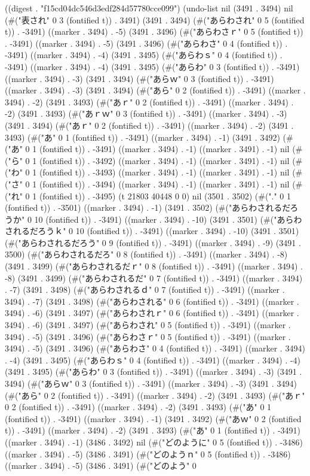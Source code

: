 
((digest . "f15cd04dc546d3edf284d57780cce099") (undo-list nil (3491 . 3494) nil (#("表され" 0 3 (fontified t)) . 3491) (3491 . 3494) (#("あらわされ" 0 5 (fontified t)) . -3491) ((marker . 3494) . -5) (3491 . 3496) (#("あらわさｒ" 0 5 (fontified t)) . -3491) ((marker . 3494) . -5) (3491 . 3496) (#("あらわさ" 0 4 (fontified t)) . -3491) ((marker . 3494) . -4) (3491 . 3495) (#("あらわｓ" 0 4 (fontified t)) . -3491) ((marker . 3494) . -4) (3491 . 3495) (#("あらわ" 0 3 (fontified t)) . -3491) ((marker . 3494) . -3) (3491 . 3494) (#("あらｗ" 0 3 (fontified t)) . -3491) ((marker . 3494) . -3) (3491 . 3494) (#("あら" 0 2 (fontified t)) . -3491) ((marker . 3494) . -2) (3491 . 3493) (#("あｒ" 0 2 (fontified t)) . -3491) ((marker . 3494) . -2) (3491 . 3493) (#("あｒｗ" 0 3 (fontified t)) . -3491) ((marker . 3494) . -3) (3491 . 3494) (#("あｒ" 0 2 (fontified t)) . -3491) ((marker . 3494) . -2) (3491 . 3493) (#("あ" 0 1 (fontified t)) . -3491) ((marker . 3494) . -1) (3491 . 3492) (#("あ" 0 1 (fontified t)) . -3491) ((marker . 3494) . -1) ((marker . 3491) . -1) nil (#("ら" 0 1 (fontified t)) . -3492) ((marker . 3494) . -1) ((marker . 3491) . -1) nil (#("わ" 0 1 (fontified t)) . -3493) ((marker . 3494) . -1) ((marker . 3491) . -1) nil (#("さ" 0 1 (fontified t)) . -3494) ((marker . 3494) . -1) ((marker . 3491) . -1) nil (#("れ" 0 1 (fontified t)) . -3495) (t 21803 40448 0 0) nil (3501 . 3502) (#("." 0 1 (fontified t)) . -3501) ((marker . 3494) . -1) (3491 . 3502) (#("あらわされるだろうか" 0 10 (fontified t)) . -3491) ((marker . 3494) . -10) (3491 . 3501) (#("あらわされるだろうｋ" 0 10 (fontified t)) . -3491) ((marker . 3494) . -10) (3491 . 3501) (#("あらわされるだろう" 0 9 (fontified t)) . -3491) ((marker . 3494) . -9) (3491 . 3500) (#("あらわされるだろ" 0 8 (fontified t)) . -3491) ((marker . 3494) . -8) (3491 . 3499) (#("あらわされるだｒ" 0 8 (fontified t)) . -3491) ((marker . 3494) . -8) (3491 . 3499) (#("あらわされるだ" 0 7 (fontified t)) . -3491) ((marker . 3494) . -7) (3491 . 3498) (#("あらわされるｄ" 0 7 (fontified t)) . -3491) ((marker . 3494) . -7) (3491 . 3498) (#("あらわされる" 0 6 (fontified t)) . -3491) ((marker . 3494) . -6) (3491 . 3497) (#("あらわされｒ" 0 6 (fontified t)) . -3491) ((marker . 3494) . -6) (3491 . 3497) (#("あらわされ" 0 5 (fontified t)) . -3491) ((marker . 3494) . -5) (3491 . 3496) (#("あらわさｒ" 0 5 (fontified t)) . -3491) ((marker . 3494) . -5) (3491 . 3496) (#("あらわさ" 0 4 (fontified t)) . -3491) ((marker . 3494) . -4) (3491 . 3495) (#("あらわｓ" 0 4 (fontified t)) . -3491) ((marker . 3494) . -4) (3491 . 3495) (#("あらわ" 0 3 (fontified t)) . -3491) ((marker . 3494) . -3) (3491 . 3494) (#("あらｗ" 0 3 (fontified t)) . -3491) ((marker . 3494) . -3) (3491 . 3494) (#("あら" 0 2 (fontified t)) . -3491) ((marker . 3494) . -2) (3491 . 3493) (#("あｒ" 0 2 (fontified t)) . -3491) ((marker . 3494) . -2) (3491 . 3493) (#("あ" 0 1 (fontified t)) . -3491) ((marker . 3494) . -1) (3491 . 3492) (#("あｗ" 0 2 (fontified t)) . -3491) ((marker . 3494) . -2) (3491 . 3493) (#("あ" 0 1 (fontified t)) . -3491) ((marker . 3494) . -1) (3486 . 3492) nil (#("どのように" 0 5 (fontified t)) . -3486) ((marker . 3494) . -5) (3486 . 3491) (#("どのようｎ" 0 5 (fontified t)) . -3486) ((marker . 3494) . -5) (3486 . 3491) (#("どのよう" 0 